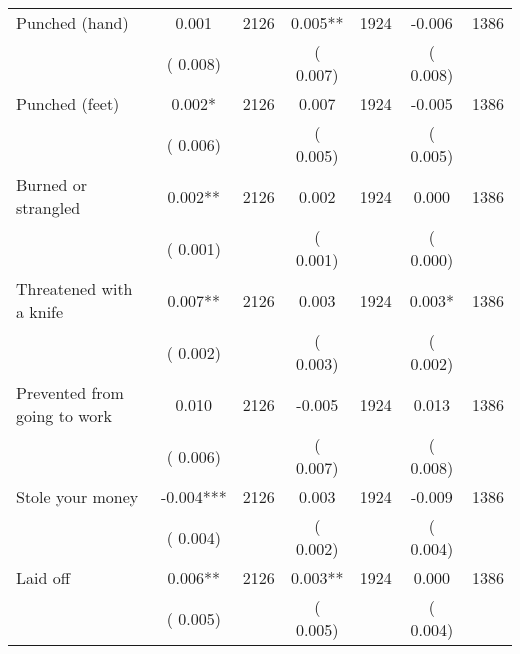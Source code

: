 \begin{tabular}{l*{6}{c}}
Punched (hand)        &              0.001      &       2126       &              0.005**      &       1924       &             -0.006      &       1386       \\
                       &       (       0.008)            &                               &       (       0.007)            &                               &       (       0.008)            &                               \\
Punched (feet)        &              0.002*      &       2126       &              0.007      &       1924       &             -0.005      &       1386       \\
                       &       (       0.006)            &                               &       (       0.005)            &                               &       (       0.005)            &                               \\
Burned or strangled        &              0.002**      &       2126       &              0.002      &       1924       &              0.000      &       1386       \\
                       &       (       0.001)            &                               &       (       0.001)            &                               &       (       0.000)            &                               \\
Threatened with a knife        &              0.007**      &       2126       &              0.003      &       1924       &              0.003*      &       1386       \\
                       &       (       0.002)            &                               &       (       0.003)            &                               &       (       0.002)            &                               \\
Prevented from going to work        &              0.010      &       2126       &             -0.005      &       1924       &              0.013      &       1386       \\
                       &       (       0.006)            &                               &       (       0.007)            &                               &       (       0.008)            &                               \\
Stole your money        &             -0.004***      &       2126       &              0.003      &       1924       &             -0.009      &       1386       \\
                       &       (       0.004)            &                               &       (       0.002)            &                               &       (       0.004)            &                               \\
Laid off        &              0.006**      &       2126       &              0.003**      &       1924       &              0.000      &       1386       \\
                       &       (       0.005)            &                               &       (       0.005)            &                               &       (       0.004)            &                               \\
\hline \end{tabular}